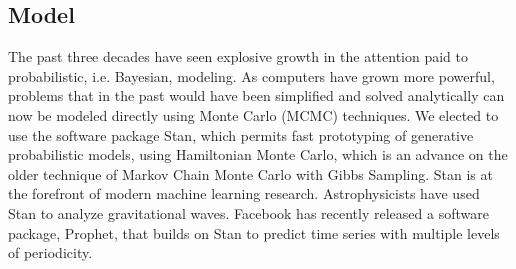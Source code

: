 \documentclass{article}
\begin{document}
\subsection{Model}
\label{subsec:model}
The past three decades have seen explosive growth in the attention paid to probabilistic, i.e. Bayesian, modeling. As computers have grown more powerful, problems that in the past would have been simplified and solved analytically can now be modeled directly using Monte Carlo (MCMC) techniques. We elected to use the software package Stan\cite{stan}, which permits fast prototyping of generative probabilistic models, using Hamiltonian Monte Carlo, which is an advance on the older technique of Markov Chain Monte Carlo with Gibbs Sampling\cite{betancourt2017conceptual}. Stan is at the forefront of modern machine learning research. Astrophysicists have used Stan to analyze gravitational waves\cite{abbott2016rate}. Facebook has recently released a software package, Prophet, that builds on Stan to predict time series with multiple levels of periodicity.
\end{document}
